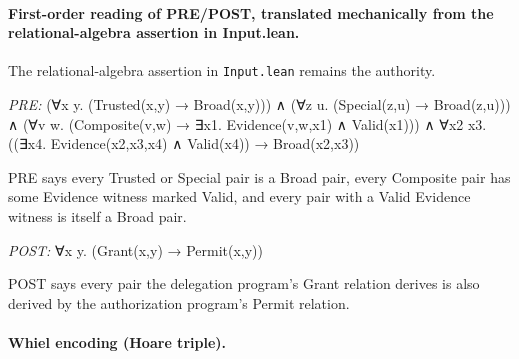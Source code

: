 \documentclass[10pt]{article}
\begin{document}
\paragraph{First-order reading of PRE/POST, translated mechanically from the relational-algebra assertion in Input.lean.} The relational-algebra assertion in \texttt{Input.lean} remains the authority.

\textit{PRE:} (∀x y. (Trusted(x,y) → Broad(x,y))) ∧ (∀z u. (Special(z,u) → Broad(z,u))) ∧ (∀v w. (Composite(v,w) → ∃x1. Evidence(v,w,x1) ∧ Valid(x1))) ∧ ∀x2 x3. ((∃x4. Evidence(x2,x3,x4) ∧ Valid(x4)) → Broad(x2,x3))\par PRE says every Trusted or Special pair is a Broad pair, every Composite pair has some Evidence witness marked Valid, and every pair with a Valid Evidence witness is itself a Broad pair.

\textit{POST:} ∀x y. (Grant(x,y) → Permit(x,y))\par POST says every pair the delegation program's Grant relation derives is also derived by the authorization program's Permit relation.

\paragraph{Whiel encoding (Hoare triple).}
\end{document}
